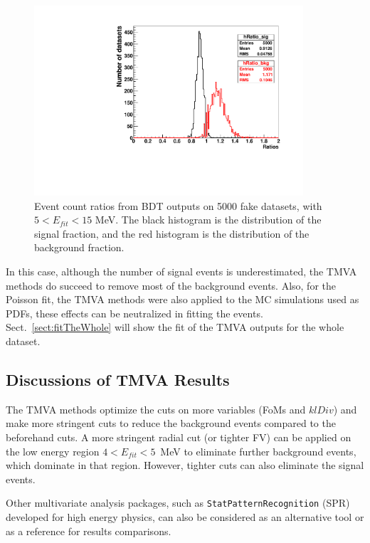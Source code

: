 \begin{figure}[!htb]
	\centering
	\includegraphics[width=10cm]{TMVAratios_fakedataset.pdf}
	\caption[Event count fractions from BDT outputs on 5000 fake datasets.]{Event count ratios from BDT outputs on 5000 fake datasets, with $5<E_{fit}<15$ MeV. The black histogram is the distribution of the signal fraction, and the red histogram is the distribution of the background fraction.\label{fig:TMVAfractions}}
\end{figure}

In this case, although the number of signal events is underestimated, the TMVA methods do succeed to remove most of the background events. Also, for the Poisson fit, the TMVA methods were also applied to the MC simulations used as PDFs, these effects can be neutralized in fitting the events. Sect.~\ref{sect:fitTheWhole} will show the fit of the TMVA outputs for the whole dataset. 

\subsection{Discussions of TMVA Results}

The TMVA methods optimize the cuts on more variables (FoMs and $klDiv$) and make more stringent cuts to reduce the background events compared to the beforehand cuts. A more stringent radial cut (or tighter FV) can be applied on the low energy region $4<E_{fit}<5$~MeV to eliminate further background events, which dominate in that region. However, tighter cuts can also eliminate the signal events.

Other multivariate analysis packages, such as \texttt{StatPatternRecognition} (SPR) \cite{sprWebsite} developed for high energy physics, can also be considered as an alternative tool or as a reference for results comparisons. 

